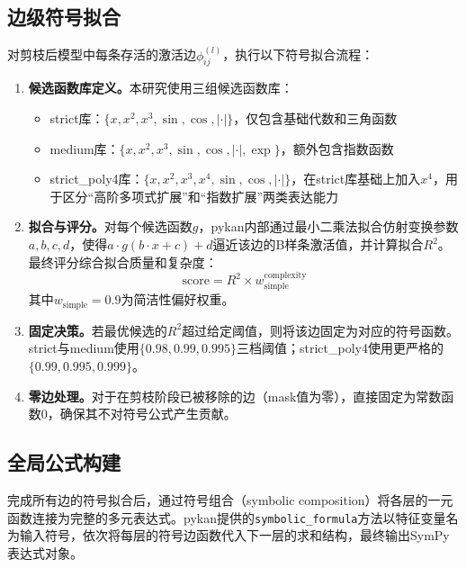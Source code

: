 \subsection{边级符号拟合}

对剪枝后模型中每条存活的激活边$\phi_{ij}^{(l)}$，执行以下符号拟合流程：

\begin{enumerate}
  \item \textbf{候选函数库定义。}本研究使用三组候选函数库：
  \begin{itemize}
    \item strict库：$\{x, x^2, x^3, \sin, \cos, |\cdot|\}$，仅包含基础代数和三角函数
    \item medium库：$\{x, x^2, x^3, \sin, \cos, |\cdot|, \exp\}$，额外包含指数函数
    \item strict\_poly4库：$\{x, x^2, x^3, x^4, \sin, \cos, |\cdot|\}$，在strict库基础上加入$x^4$，用于区分“高阶多项式扩展”和“指数扩展”两类表达能力
  \end{itemize}

  \item \textbf{拟合与评分。}对每个候选函数$g$，pykan内部通过最小二乘法拟合仿射变换参数$a, b, c, d$，使得$a \cdot g(b \cdot x + c) + d$逼近该边的B样条激活值，并计算拟合$R^2$。最终评分综合拟合质量和复杂度：
  \begin{equation}
  \text{score} = R^2 \times w_{\text{simple}}^{\text{complexity}}
  \end{equation}
  其中$w_{\text{simple}} = 0.9$为简洁性偏好权重。

  \item \textbf{固定决策。}若最优候选的$R^2$超过给定阈值，则将该边固定为对应的符号函数。strict与medium使用$\{0.98, 0.99, 0.995\}$三档阈值；strict\_poly4使用更严格的$\{0.99, 0.995, 0.999\}$。

  \item \textbf{零边处理。}对于在剪枝阶段已被移除的边（mask值为零），直接固定为常数函数$0$，确保其不对符号公式产生贡献。
\end{enumerate}

\subsection{全局公式构建}

完成所有边的符号拟合后，通过符号组合（symbolic composition）将各层的一元函数连接为完整的多元表达式。pykan提供的\texttt{symbolic\_formula}方法以特征变量名为输入符号，依次将每层的符号边函数代入下一层的求和结构，最终输出SymPy表达式对象。

